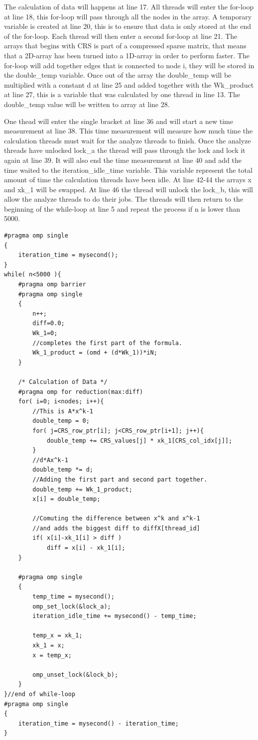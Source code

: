 \documentclass[12pt,a4paper,USenglish]{article}      %
\begin{document}
The calculation of data will happens at line 17. All threads will enter the for-loop at line 18, this for-loop will pass through all the nodes in the array. A temporary variable is created at line 20, this is to ensure that data is only stored at the end of the for-loop. Each thread will then enter a second for-loop at line 21. The arrays that begins with CRS is part of a compressed sparse matrix, that means that a 2D-array has been turned into a 1D-array in order to perform faster. The for-loop will add together edges that is connected to node i, they will be stored in the double\_temp variable. Once out of the array the double\_temp will be multiplied with a constant d at line 25 and added together with the Wk\_product at line 27, this is a variable that was calculated by one thread in line 13.
The double\_temp value will be written to array at line 28.

One thead will enter the single bracket at line 36 and will start a new time measurement at line 38. This time measurement will measure how much time the calculation threads must wait for the analyze threads to finish. Once the analyze threads have unlocked lock\_a the thread will pass through the lock and lock it again at line 39. It will also end the time measurement at line 40 and add the time waited to the iteration\_idle\_time variable. This variable represent the total amount of time the calculation threads have been idle.
At line 42-44 the arrays x and xk\_1 will be swapped. At line 46 the thread will unlock the lock\_b, this will allow the analyze threads to do their jobs. The threads will then return to the beginning of the while-loop at line 5 and repeat the process if n is lower than 5000.


\begin{lstlisting}[caption=Calculation]
#pragma omp single
{
	iteration_time = mysecond();
}
while( n<5000 ){ 
	#pragma omp barrier
	#pragma omp single
	{
		n++;
		diff=0.0;	
		Wk_1=0;
		//completes the first part of the formula.
		Wk_1_product = (omd + (d*Wk_1))*iN;
	}
	
	/* Calculation of Data */
	#pragma omp for reduction(max:diff)
	for( i=0; i<nodes; i++){
		//This is A*x^k-1
		double_temp = 0;
		for( j=CRS_row_ptr[i]; j<CRS_row_ptr[i+1]; j++){ 
			double_temp += CRS_values[j] * xk_1[CRS_col_idx[j]];
		}
		//d*Ax^k-1
		double_temp *= d;
		//Adding the first part and second part together.
		double_temp += Wk_1_product;
		x[i] = double_temp;

		//Comuting the difference between x^k and x^k-1
		//and adds the biggest diff to diffX[thread_id]
		if( x[i]-xk_1[i] > diff )
			diff = x[i] - xk_1[i];
	}

	#pragma omp single
	{
		temp_time = mysecond();
		omp_set_lock(&lock_a);
		iteration_idle_time += mysecond() - temp_time;

		temp_x = xk_1;
		xk_1 = x;
		x = temp_x;
		
		omp_unset_lock(&lock_b);
	}
}//end of while-loop
#pragma omp single
{
	iteration_time = mysecond() - iteration_time;
}
\end{lstlisting}
\end{document}
